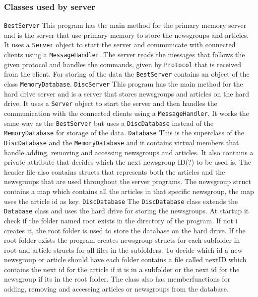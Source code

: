 \documentclass[a4paper]{article}
\def\code#1{\texttt{#1}}
\begin{document}
\subsubsection{Classes used by server}
\code{BestServer}\newline
This program has the main method for the primary memory server and  is the server that use primary memory to store the newsgroups and articles. It uses a \code{Server} object to start the server and communicate with connected clients using a \code{MessageHandler}. The server reads the messages that follows the given protocol and handles the commands, given by \code{Protocol} that is received from the client. For storing of the data the \code{BestServer} contains an object of the class \code{MemoryDatabase}.
\newline \newline
\code{DiscServer}\newline
This program has the main method for the hard drive server and is a server that stores newsgroups and articles on the hard drive. It uses a \code{Server} object to start the server and then handles the communication with the connected clients using a \code{MessageHandler}. It works the same way as the \code{BestServer} but uses a \code{DiscDatabase} instead of the \code{MemoryDatabase} for storage of the data. 
\newline \newline
\code{Database}\newline
This is the superclass of the \code{DiscDatabase} and the \code{MemoryDatabase} and it contains virtual members that handle adding, removing and accessing newsgroups and articles. It also contains a private attribute that decides which the next newsgroup ID(?) to be used is. The header file also contains structs that represents both the articles and the newsgroups that are used throughout the server programs. The newsgroup struct contains a map which contains all the articles in that specific newsgroup, the map uses the article id as key.
\newline \newline
\code{DiscDatabase}\newline
The \code{DiscDatabase} class extends the \code{Database} class and uses the hard drive for storing the newsgroups. At startup it check if the folder named root exists in the directory of the program. If not i creates it, the root folder is used to store the database on the hard drive. If the root folder exists the program creates newsgroup structs for each subfolder in root and article structs for all files in the subfolders. To decide which id a new newsgroup or article should have each folder contains a file called nextID which contains the next id for the article if it is in a subfolder or the next id for the newsgroup if its in the root folder. The class also has memberfunctions for adding, removing and accessing articles or newsgroups from the database.
\end{document}

